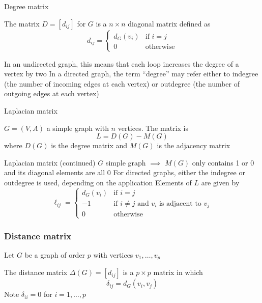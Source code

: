 \documentclass[aspectratio=43]{beamer}
\begin{document}
\begin{frame}{Degree matrix}
	\begin{definition}
		The  matrix $D=[d_{ij}]$ for $G$ is a $n \times n$ diagonal matrix defined as
		\[
			d_{ij} = \begin{cases}
				d_G(v_i) & \text{if } i = j \\
				0 & \text{otherwise}
			\end{cases}
		\]
	\end{definition}
\vfill
In an undirected graph, this means that each loop increases the degree of a vertex by two
\vfill
In a directed graph, the term ``degree'' may refer either to indegree (the number of incoming edges at each vertex) or outdegree (the number of outgoing edges at each vertex)
\end{frame}

\begin{frame}{Laplacian matrix}
\begin{definition}
	$G=(V,A)$ a simple graph with $n$ vertices. The  matrix is 
	\[
		L=D(G)-M(G)
	\]
	where $D(G)$ is the degree matrix and $M(G)$ is the adjacency matrix
\end{definition}
\end{frame}

\begin{frame}{Laplacian matrix (continued)}
$G$ simple graph $\implies$ $M(G)$ only contains 1 or 0 and its diagonal elements are all 0
\vfill
For directed graphs, either the indegree or outdegree is used, depending on the application
\vfill
Elements of $L$ are given by
\[
\ell_{ij}=\begin{cases}
	d_G(v_{i}) & \text{if } i=j\\
	-1 & \text{if } i\neq j \text{ and } v_{i} 
	\text{ is adjacent to }v_{j}\\
	0 & \text{otherwise}
\end{cases}
\]
\end{frame}


\begin{frame}\frametitle{Distance matrix}
	Let $G$ be a graph of order $p$ with vertices $v_1, \ldots , v_p$
	\begin{definition}
	The distance matrix $\Delta(G)=[d_{ij}]$ is a $p\times p$ matrix in which
	$$\delta_{ij}=
	d_G(v_i,v_j)
	$$
	Note $\delta_{ii}=0$ for $i=1,\ldots, p$
	\end{definition}
\end{frame}
\end{document}
